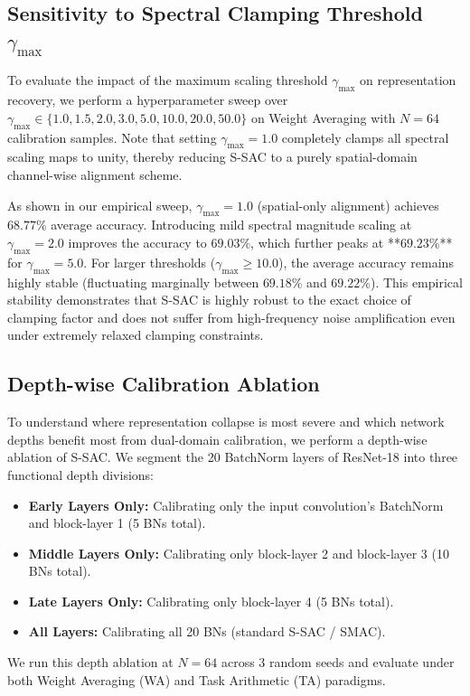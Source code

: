 \documentclass{article}
\theoremstyle{plain}
\theoremstyle{definition}
\theoremstyle{remark}
\begin{document}
\subsection{Sensitivity to Spectral Clamping Threshold $\gamma_{\text{max}}$}
To evaluate the impact of the maximum scaling threshold $\gamma_{\text{max}}$ on representation recovery, we perform a hyperparameter sweep over $\gamma_{\text{max}} \in \{1.0, 1.5, 2.0, 3.0, 5.0, 10.0, 20.0, 50.0\}$ on Weight Averaging with $N=64$ calibration samples. Note that setting $\gamma_{\text{max}} = 1.0$ completely clamps all spectral scaling maps to unity, thereby reducing S-SAC to a purely spatial-domain channel-wise alignment scheme. 

As shown in our empirical sweep, $\gamma_{\text{max}} = 1.0$ (spatial-only alignment) achieves $68.77\%$ average accuracy. Introducing mild spectral magnitude scaling at $\gamma_{\text{max}} = 2.0$ improves the accuracy to $69.03\%$, which further peaks at **$69.23\%$** for $\gamma_{\text{max}} = 5.0$. For larger thresholds ($\gamma_{\text{max}} \ge 10.0$), the average accuracy remains highly stable (fluctuating marginally between $69.18\%$ and $69.22\%$). This empirical stability demonstrates that S-SAC is highly robust to the exact choice of clamping factor and does not suffer from high-frequency noise amplification even under extremely relaxed clamping constraints.

\subsection{Depth-wise Calibration Ablation}
To understand where representation collapse is most severe and which network depths benefit most from dual-domain calibration, we perform a depth-wise ablation of S-SAC. We segment the 20 BatchNorm layers of ResNet-18 into three functional depth divisions:
\begin{itemize}
    \item \textbf{Early Layers Only:} Calibrating only the input convolution's BatchNorm and block-layer 1 (5 BNs total).
    \item \textbf{Middle Layers Only:} Calibrating only block-layer 2 and block-layer 3 (10 BNs total).
    \item \textbf{Late Layers Only:} Calibrating only block-layer 4 (5 BNs total).
    \item \textbf{All Layers:} Calibrating all 20 BNs (standard S-SAC / SMAC).
\end{itemize}
We run this depth ablation at $N=64$ across 3 random seeds and evaluate under both Weight Averaging (WA) and Task Arithmetic (TA) paradigms.
\end{document}
